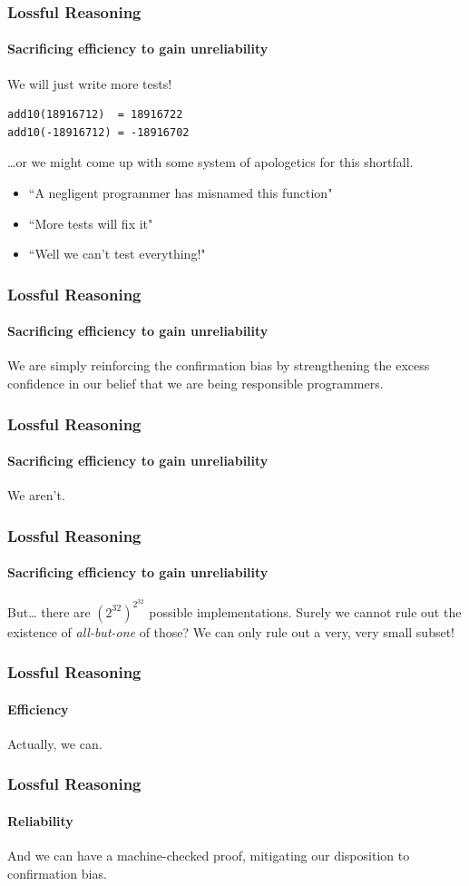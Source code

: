 \begin{frame}[fragile]
\frametitle{Lossful Reasoning}
\framesubtitle{Sacrificing efficiency to gain unreliability}
We will just write more tests!
\begin{lstlisting}[style=scala]
add10(18916712)  = 18916722
add10(-18916712) = -18916702
\end{lstlisting}
\ldots or we might come up with some system of apologetics for this shortfall.
\begin{itemize}
  \item ``A negligent programmer has misnamed this function"
  \item ``More tests will fix it"
  \item ``Well we can't test everything!"
\end{itemize}
\end{frame}

\begin{frame}[fragile]
\frametitle{Lossful Reasoning}
\framesubtitle{Sacrificing efficiency to gain unreliability}
\begin{center}{We are simply reinforcing the confirmation bias by strengthening 
the excess confidence in our belief that we are being responsible programmers.}
\end{center}
\end{frame}

\begin{frame}[fragile]
\frametitle{Lossful Reasoning}
\framesubtitle{Sacrificing efficiency to gain unreliability}
\begin{center}
We aren't.
\end{center}
\end{frame}

\begin{frame}[fragile]
\frametitle{Lossful Reasoning}
\framesubtitle{Sacrificing efficiency to gain unreliability}
\begin{block}{But\ldots}
there are {$({2^{32}})^{2^{32}}$} possible implementations. Surely we cannot 
rule out the existence of \emph{all-but-one} of those? We can only rule out a
\scriptsize{very, very} \tiny{small subset}!
\end{block}
\end{frame}

\begin{frame}[fragile]
\frametitle{Lossful Reasoning}
\framesubtitle{Efficiency}
\begin{center}
Actually, we can.
\end{center}
\end{frame}

\begin{frame}[fragile]
\frametitle{Lossful Reasoning}
\framesubtitle{Reliability}
\begin{center}
And we can have a machine-checked proof, mitigating our disposition to
confirmation bias.
\end{center}
\end{frame}
